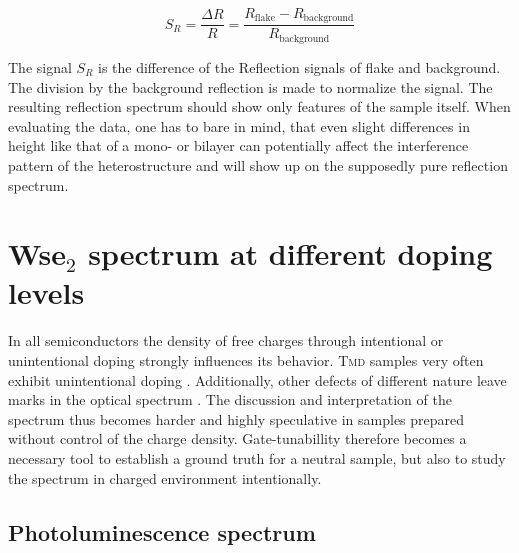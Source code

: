 \[ 
	S_R = \frac{\Delta R}{R} = \frac{R_{\mathrm{flake}} - R_{\mathrm{background}}}{R_{\mathrm{background}}}
\]

The signal $S_R$ is the difference of the Reflection signals of \tmdg flake and background. The division by the background reflection is made to normalize the signal. The resulting reflection spectrum should show only features of the sample itself. When evaluating the data, one has to bare in mind, that even slight differences in height like that of a mono- or bilayer can potentially affect the interference pattern of the heterostructure and will show up on the supposedly pure reflection spectrum. 

\section{Ws\textup{e}$_2$ spectrum at different doping levels}

In all semiconductors the density of free charges through intentional or unintentional doping strongly influences its behavior. \textsc{Tmd} samples very often exhibit unintentional doping \cite{kang_origin_2017, eshun_doping_2015}. Additionally, other defects of different nature leave marks in the optical spectrum  \cite{chow_defect-induced_2015,lin_defect_2016}. The discussion and interpretation of the spectrum thus becomes harder and highly speculative in samples prepared without control of the charge density. Gate-tunabillity therefore becomes a necessary tool to establish a ground truth for a neutral sample, but also to study the spectrum in charged environment intentionally.

\subsection{Photoluminescence spectrum}

